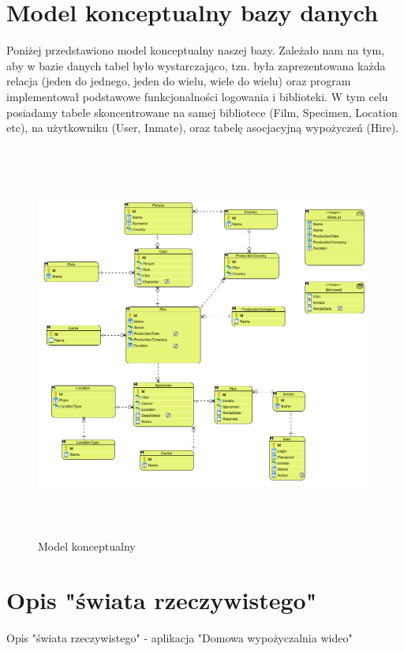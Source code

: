 \documentclass{article}
\begin{document}
	\section{Model konceptualny bazy danych}
	Poniżej przedstawiono model konceptualny naszej bazy. Zależało nam na tym, aby w bazie danych tabel było wystarczająco, tzn. była zaprezentowana każda relacja (jeden do jednego, jeden do wielu, wiele do wielu) oraz program implementował podstawowe funkcjonalności logowania i biblioteki. W tym celu posiadamy tabele skoncentrowane na samej bibliotece (Film, Specimen, Location etc), na użytkowniku (User, Inmate), oraz tabelę asocjacyjną wypożyczeń (Hire).
	\begin{figure}[!ht]	
		\centering
		\includegraphics[height=13cm]{model_konceptualny.png}
		\caption{Model konceptualny}
		\label{fig:obrazek 0}
	\end{figure}
	\newpage
	\section{Opis "świata rzeczywistego"}
	Opis "świata rzeczywistego" - aplikacja "Domowa wypożyczalnia wideo"
\end{document}
